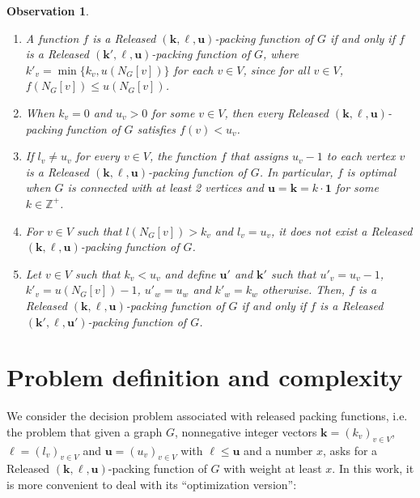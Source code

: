 \documentclass[preprint,12pt]{article}
\renewcommand{\leq}{\leqslant}
\newtheorem{observation}[theorem]{Observation}
\theoremstyle{definition}
\begin{document}
\begin{observation}\label{rem:kuP}

\begin{enumerate}
For a graph $G=(V,E)$ and vectors  $\mathbf{k}=(k_v)_{v\in V}$, $\boldsymbol\ell=(l_v)_{v\in V}$ and $\mathbf{u}=(u_v)_{v\in V}$ with $\boldsymbol\ell \leq \mathbf{u}$ it holds: 
\item[i.] A function $f$ is a Released  $(\mathbf{k}, \boldsymbol\ell, \mathbf{u})$-packing function  of $G$ if and only if $f$ is  a Released  $(\mathbf{k'}, \boldsymbol\ell, \mathbf{u})$-packing function of $G$, where $k'_v = \min\{k_v, u(N_G[v])\}$ for each $v\in V$, since for  all $v\in V$, 
 $f(N_G[v])\leq u(N_G[v])$.  
\item[ii.]  When $k_v=0$ and $u_v>0$ for some $v\in V$, then every Released  $(\mathbf{k}, \boldsymbol\ell, \mathbf{u})$-packing function of $G$ satisfies $f(v) <u_v$.
\item[iii.] If $l_v \neq u_v$ for every $v\in V$,  the function $f$ that assigns $u_v-1$ to each vertex $v$ is a Released  $(\mathbf{k}, \boldsymbol\ell, \mathbf{u})$-packing function of $G$. In particular, $f$ is optimal when $G$ is connected with at least 2 vertices and $\mathbf{u}=\mathbf{k}= k \cdot \mathbf{1}$  for some $k\in \mathbb{Z}^+$.
\item[iv.] For  $v \in V$ such that $l(N_G[v])> k_v$ and  $l_v=u_v$,  it does not exist a Released  $(\mathbf{k}, \boldsymbol\ell, \mathbf{u})$-packing function of $G$.
\item[v.]  Let  $v\in V$ such that $k_v < u_v$ and define $\mathbf{u}'$ and $\mathbf{k}'$ such that $u'_v = u_v-1$, $k'_v= u(N_G[v])-1$, $u'_w=u_w$ and $k'_w=k_w$ otherwise. Then, $f$ is a   Released  $(\mathbf{k}, \boldsymbol\ell, \mathbf{u})$-packing function  of $G$ if and only if  $f$ is  a Released  $(\mathbf{k'}, \boldsymbol\ell, \mathbf{u'})$-packing function of $G$. 

 \end{enumerate}
\end{observation}



\section{Problem definition and complexity}\label{sec:problemdef}


We consider the decision problem associated with released packing functions, i.e. the problem that given a graph $G$,   nonnegative  integer vectors  $\mathbf{k}=(k_v)_{v\in V}$,  $\boldsymbol\ell=(l_v)_{v\in V}$ and $\mathbf{u}=(u_v)_{v\in V}$ with $\boldsymbol\ell \leq \mathbf{u}$ and a number $x$, asks for a Released  $(\mathbf{k}, \boldsymbol\ell, \mathbf{u})$-packing function of $G$ with weight at least $x$. In this work, it is more convenient to deal with its ``optimization version'':
\end{document}
